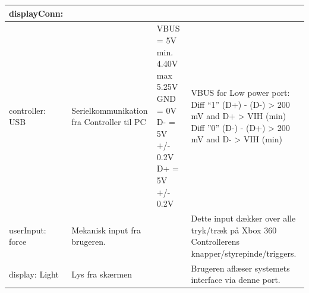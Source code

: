\begin{table}[h]
\begin{tabularx}{\textwidth}{|l|X|X|X|}
\\ \hline
	
displayConn:
	&   
	&  
	&  
	\\ \hline
	
controller: USB
	& Serielkommunikation fra Controller til PC 
	& VBUS = 5V min. 4.40V max 5.25V \newline
		GND = 0V \newline
		D- = 5V +/- 0.2V \newline
		D+ = 5V +/- 0.2V \newline
	& VBUS for Low power port: \newline
		Diff  “1” \newline
		(D+) - (D-) > 200 mV \newline
		and D+ > VIH (min) \newline
		Diff ”0” \newline
		(D-) - (D+) > 200 mV \newline
		and D- > VIH (min) \newline
	\\ \hline
	
userInput: force
	& Mekanisk input fra brugeren.
	& 
	& Dette input dækker over alle tryk/træk på Xbox 360 Controllerens knapper/styrepinde/triggers.
	\\ \hline
	
display: Light
	& Lys fra skærmen
	& 
	& Brugeren aflæser systemets interface via denne port.
	\\ \hline
	\end{tabularx}
\end{table}